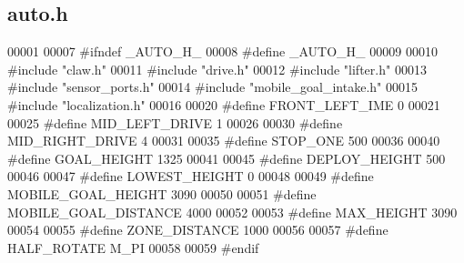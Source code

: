 \subsection{auto.\+h}
\label{a00002_source}

\begin{DoxyCode}
00001 
00007 \textcolor{preprocessor}{#ifndef \_AUTO\_H\_}
00008 \textcolor{preprocessor}{#define \_AUTO\_H\_}
00009 
00010 \textcolor{preprocessor}{#include "claw.h"}
00011 \textcolor{preprocessor}{#include "drive.h"}
00012 \textcolor{preprocessor}{#include "lifter.h"}
00013 \textcolor{preprocessor}{#include "sensor_ports.h"}
00014 \textcolor{preprocessor}{#include "mobile_goal_intake.h"}
00015 \textcolor{preprocessor}{#include "localization.h"}
00016 
00020 \textcolor{preprocessor}{#define FRONT\_LEFT\_IME 0}
00021 
00025 \textcolor{preprocessor}{#define MID\_LEFT\_DRIVE 1}
00026 
00030 \textcolor{preprocessor}{#define MID\_RIGHT\_DRIVE 4}
00031 
00035 \textcolor{preprocessor}{#define STOP\_ONE 500}
00036 
00040 \textcolor{preprocessor}{#define GOAL\_HEIGHT 1325}
00041 
00045 \textcolor{preprocessor}{#define DEPLOY\_HEIGHT 500}
00046 
00047 \textcolor{preprocessor}{#define LOWEST\_HEIGHT 0}
00048 
00049 \textcolor{preprocessor}{#define MOBILE\_GOAL\_HEIGHT 3090}
00050 
00051 \textcolor{preprocessor}{#define MOBILE\_GOAL\_DISTANCE 4000}
00052 
00053 \textcolor{preprocessor}{#define MAX\_HEIGHT 3090}
00054 
00055 \textcolor{preprocessor}{#define ZONE\_DISTANCE 1000}
00056 
00057 \textcolor{preprocessor}{#define HALF\_ROTATE M\_PI}
00058 
00059 \textcolor{preprocessor}{#endif}
\end{DoxyCode}
